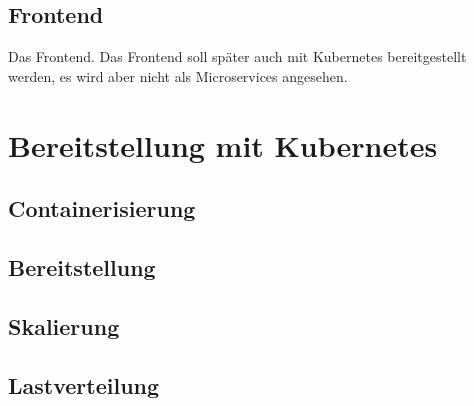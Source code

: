 \subsection{Frontend}

Das Frontend. Das Frontend soll später auch mit Kubernetes bereitgestellt werden, es wird aber nicht als Microservices angesehen.

\section{Bereitstellung mit Kubernetes}

\subsection{Containerisierung}

\subsection{Bereitstellung}

\subsection{Skalierung}

\subsection{Lastverteilung}

